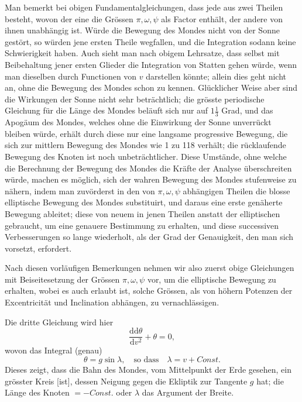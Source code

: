 \par\noindent\hspace*{\parindent}Man bemerkt bei obigen Fundamentalgleichungen, dass jede aus zwei
Theilen besteht, wovon der eine die Grössen \(\pi,\omega,\psi\) als Factor
enthält, der andere von ihnen unabhängig ist. Würde die Bewegung des Mondes
nicht von der Sonne gestört, so würden jene ersten Theile wegfallen, und die
Integration sodann keine Schwierigkeit haben. Auch sieht man nach obigem
Lehrsatze, dass selbst mit Beibehaltung jener ersten Glieder die Integration
von Statten gehen würde, wenn man dieselben durch Functionen von \(v\)
darstellen könnte; allein dies geht nicht an, ohne die Bewegung des Mondes
schon zu kennen. Glücklicher Weise aber sind die Wirkungen der Sonne nicht
sehr beträchtlich; die grösste periodische Gleichung für die Länge des Mondes
beläuft sich nur auf \(1\tfrac13\) Grad, und das Apogäum des Mondes, welches
ohne die Einwirkung der Sonne unverrückt bleiben würde, erhält durch diese
nur eine langsame progressive Bewegung, die sich zur mittlern Bewegung des
Mondes wie 1 zu 118 verhält; die rücklaufende Bewegung des Knoten ist noch
unbeträchtlicher. Diese Umstände, ohne welche die Berechnung der Bewegung
des Mondes die Kräfte der Analyse überschreiten würde, machen es möglich,
sich der wahren Bewegung des Mondes stufenweise zu nähern, indem man
zuvörderst in den von \(\pi,\omega,\psi\) abhängigen Theilen die blosse
elliptische Bewegung des Mondes substituirt, und daraus eine erste genäherte
Bewegung ableitet; diese von neuem in jenen Theilen anstatt der elliptischen
gebraucht, um eine genauere Bestimmung zu erhalten, und diese successiven
Verbesserungen so lange wiederholt, als der Grad der Genauigkeit, den man
sich vorsetzt, erfordert.

\par\noindent\hspace*{\parindent}Nach diesen vorläufigen Bemerkungen nehmen wir also zuerst obige
Gleichungen mit Beiseitesetzung der Grössen \(\pi,\omega,\psi\) vor, um die
elliptische Bewegung zu erhalten, wobei es auch erlaubt ist, solche Grössen,
als von höhern Potenzen der Excentricität und Inclination abhängen, zu
vernachlässigen.

\par\noindent\hspace*{\parindent}Die dritte Gleichung wird hier
\[
\frac{\mathrm{dd}\theta}{\mathrm{d}v^2}+\theta=0,
\]
\noindent wovon das Integral (genau)
\[
\theta=g\sin\lambda,\quad\text{so dass}\quad\lambda=v+\mathit{Const.}
\]
\noindent Dieses zeigt, dass die Bahn des Mondes, vom Mittelpunkt der Erde
gesehen, ein grösster Kreis [ist], dessen Neigung gegen die Ekliptik zur
Tangente \(g\) hat; die Länge des Knoten \(=-\mathit{Const.}\) oder \(\lambda\)
das Argument der Breite\HistoricalNoteEight{Aber nicht in der Bahn des Mondes,
sondern auf der Ekliptik gezählt.]}.

